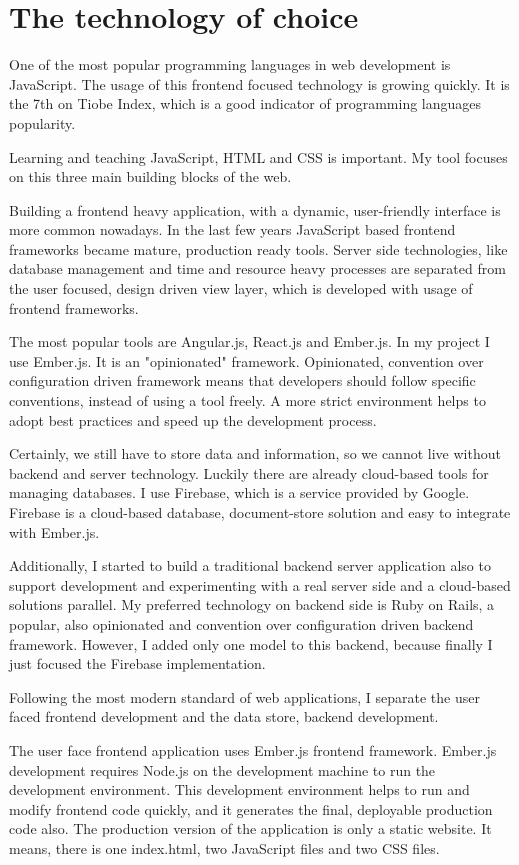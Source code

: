 \documentclass[12pt, a4paper, oneside, openright, medskipamount]{report}
\begin{document}
\section{The technology of choice}

One of the most popular programming languages in web development is JavaScript. The usage of this frontend focused technology is growing quickly.  It is the 7th on Tiobe Index, which is a good indicator of programming languages popularity. \cite{tiobe}

Learning and teaching JavaScript, HTML and CSS is important. My tool focuses on this three main building blocks of the web.

Building a frontend heavy application, with a dynamic, user-friendly interface is more common nowadays. In the last few years JavaScript based frontend frameworks became mature, production ready tools. Server side technologies, like database management and time and resource heavy processes are separated from the user focused, design driven view layer, which is developed with usage of frontend frameworks.

The most popular tools are Angular.js, React.js and Ember.js. In my project I use Ember.js. It is an "opinionated" framework. Opinionated, convention over configuration driven framework means that developers should follow specific conventions, instead of using a tool freely. A more strict environment helps to adopt best practices and speed up the development process.

Certainly, we still have to store data and information, so we cannot live without backend and server technology. Luckily there are already cloud-based tools for managing databases. I use Firebase, which is a service provided by Google. Firebase is a cloud-based database, document-store solution and easy to integrate with Ember.js.

Additionally, I started to build a traditional backend server application also to support development and experimenting with a real server side and a cloud-based solutions parallel. My preferred technology on backend side is Ruby on Rails, a popular, also opinionated and convention over configuration driven backend framework. However, I added only one model to this backend, because finally I just focused the Firebase implementation.

Following the most modern standard of web applications, I separate the user faced frontend development and the data store, backend development.

The user face frontend application uses Ember.js frontend framework. Ember.js development requires Node.js on the development machine to run the development environment. This development environment helps to run and modify frontend code quickly, and it generates the final, deployable production code also. The production version of the application is only a static website. It means, there is one index.html, two JavaScript files and two CSS files.
\end{document}
